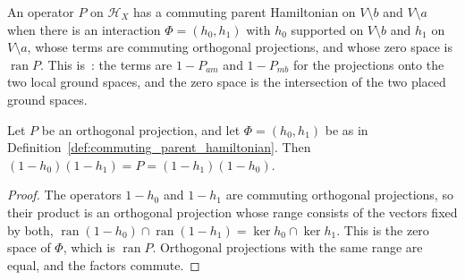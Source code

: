 \begin{definition}
    \label{def:commuting_parent_hamiltonian}
    \leanok
    An operator $P$ on $\mathcal H_X$ has a commuting parent Hamiltonian on
    $V\setminus b$ and $V\setminus a$ when there is an interaction $\Phi=(h_0,h_1)$ with
    $h_0$ supported on $V\setminus b$ and $h_1$ on $V\setminus a$, whose terms are
    commuting orthogonal projections, and whose zero space is $\operatorname{ran}P$.
    This is~\cite[Definition~D.2, lines 2205--2218]{Cirac2016MPDO_arXiv}: the terms are
    $1-P_{am}$ and $1-P_{mb}$ for the projections onto the two local ground spaces, and
    the zero space is the intersection of the two placed ground spaces.
\end{definition}

\begin{lemma}
    \label{lem:commuting_parent_product}
    \leanok
    Let $P$ be an orthogonal projection, and let $\Phi=(h_0,h_1)$ be as in
    Definition~\ref{def:commuting_parent_hamiltonian}. Then
    $(1-h_0)(1-h_1)=P=(1-h_1)(1-h_0)$.
\end{lemma}
\begin{proof}\leanok
    The operators $1-h_0$ and $1-h_1$ are commuting orthogonal projections, so their
    product is an orthogonal projection whose range consists of the vectors fixed by
    both, $\operatorname{ran}(1-h_0)\cap\operatorname{ran}(1-h_1)=\ker h_0\cap\ker h_1$.
    This is the zero space of $\Phi$, which is $\operatorname{ran}P$. Orthogonal
    projections with the same range are equal, and the factors commute.
\end{proof}

